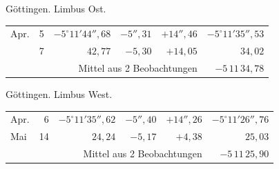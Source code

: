 \noindent\begin{minipage}[t]{.495\textwidth}\centering Göttingen. Limbus Ost.\par\smallskip
{\scriptsize\setlength{\tabcolsep}{1pt}\renewcommand{\arraystretch}{1.2}\begin{tabular}{lr|r|r|r|r|}
Apr.&5&$-5^\circ11'44''{,}68$&$-5''{,}31$&$+14''{,}46$&$-5^\circ11'35''{,}53$\\
&7&$42{,}77$&$-5{,}30$&$+14{,}05$&$34{,}02$\\
\cline{6-6}\multicolumn{5}{r}{Mittel aus 2 Beobachtungen}&$-5\,11\,34{,}78$
\end{tabular}}\end{minipage}\hfill\begin{minipage}[t]{.495\textwidth}\centering Göttingen. Limbus West.\par\smallskip
{\scriptsize\setlength{\tabcolsep}{1pt}\renewcommand{\arraystretch}{1.2}\begin{tabular}{lr|r|r|r|r}
Apr.&6&$-5^\circ11'35''{,}62$&$-5''{,}40$&$+14''{,}26$&$-5^\circ11'26''{,}76$\\
Mai&14&$24{,}24$&$-5{,}17$&$+4{,}38$&$25{,}03$\\
\cline{6-6}\multicolumn{5}{r}{Mittel aus 2 Beobachtungen}&$-5\,11\,25{,}90$
\end{tabular}}\end{minipage}
\par\vspace{4mm}

